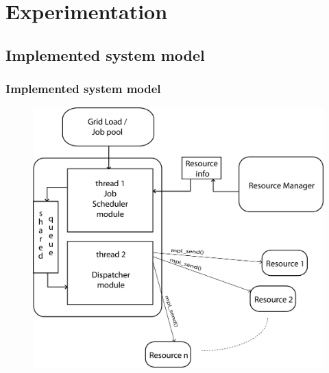 \documentclass{beamer}
\begin{document}
\section[Experimentation]{Experimentation}
\subsection*{Implemented system model}
\begin{frame}
 \frametitle{Implemented system model}
\begin{figure}[t]
    \centering
    \includegraphics[height=0.82\textheight]{imgs/implement}
	\label{fig:Systemmodel}
\end{figure}
\end{frame}
\end{document}
